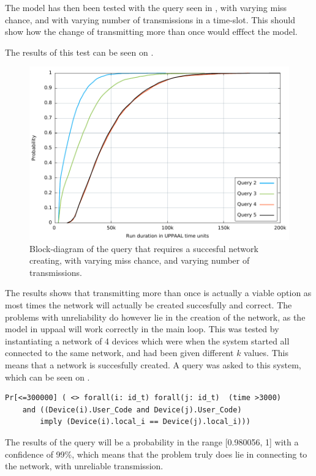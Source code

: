 The model has then been tested with the query seen in , with varying miss chance, and with varying number of transmissions in a time-slot.
This should show how the change of transmitting more than once would efffect the model.

The results of this test can be seen on .

\begin{figure}[ht]
  \includegraphics[width=1\textwidth]{Figures/Graphs/gnuplot/uppaal/graph.pdf} 
\caption{Block-diagram of the query that requires a succesful network creating, with varying miss chance, and varying number of transmissions.}
\label{CCUC-Graph-UPPAAL}
\end{figure}

The results shows that transmitting more than once is actually a viable option as most times the network will actually be created succesfully and correct.
The problems with unreliability do however lie in the creation of the network, as the model in uppaal will work correctly in the main loop.
This was tested by instantiating a network of 4 devices which were when the system started all connected to the same network, and had been given different $k$ values. 
This means that a network is succesfully created.
A query was asked to this system, which can be seen on .

\begin{lstlisting}[style=UPPAAL, caption={Query for UPPAAL asking if for all devices i and j, when they are in the location \texttt{User\_Code} will they have they then have the same value for \texttt{local\_i}.}, label={stable-network-query}]
Pr[<=300000] ( <> forall(i: id_t) forall(j: id_t)  (time >3000) 
	and ((Device(i).User_Code and Device(j).User_Code) 
		imply (Device(i).local_i == Device(j).local_i)))
\end{lstlisting}
The results of the query will be a probability in the range [0.980056, 1] with a confidence of 99\%, which means that the problem truly does lie in connecting to the network, with unreliable transmission.

